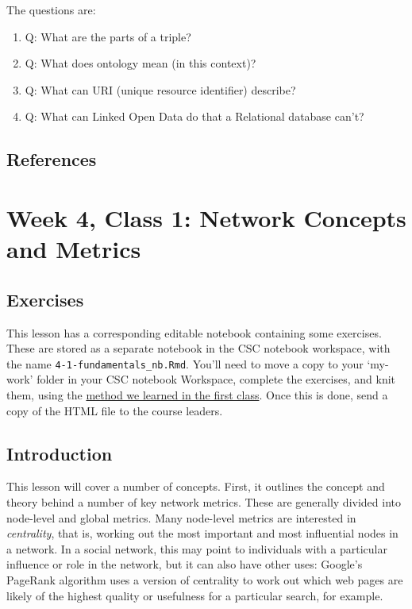 \documentclass[
]{book}
\providecommand{\tightlist}{%
  \setlength{\itemsep}{0pt}\setlength{\parskip}{0pt}}
\begin{document}
The questions are:

\begin{enumerate}
\def\labelenumi{\arabic{enumi})}
\tightlist
\item
  Q: What are the parts of a triple?
\item
  Q: What does ontology mean (in this context)?
\item
  Q: What can URI (unique resource identifier) describe?
\item
  Q: What can Linked Open Data do that a Relational database can't?
\end{enumerate}

\hypertarget{references-3}{%
\section{References}\label{references-3}}

\hypertarget{week-4-class-1-network-concepts-and-metrics}{%
\chapter{Week 4, Class 1: Network Concepts and Metrics}\label{week-4-class-1-network-concepts-and-metrics}}

\hypertarget{exercises-1}{%
\section{Exercises}\label{exercises-1}}

This lesson has a corresponding editable notebook containing some exercises. These are stored as a separate notebook in the CSC notebook workspace, with the name \texttt{4-1-fundamentals\_nb.Rmd}. You'll need to move a copy to your `my-work' folder in your CSC notebook Workspace, complete the exercises, and knit them, using the \href{https://comhis.github.io/applying-network-analysis-to-humanities/notebooks/1-1-introduction_nb.html}{method we learned in the first class}. Once this is done, send a copy of the HTML file to the course leaders.

\hypertarget{introduction-2}{%
\section{Introduction}\label{introduction-2}}

This lesson will cover a number of concepts. First, it outlines the concept and theory behind a number of key network metrics. These are generally divided into node-level and global metrics. Many node-level metrics are interested in \emph{centrality}, that is, working out the most important and most influential nodes in a network. In a social network, this may point to individuals with a particular influence or role in the network, but it can also have other uses: Google's PageRank algorithm uses a version of centrality to work out which web pages are likely of the highest quality or usefulness for a particular search, for example.
\end{document}
